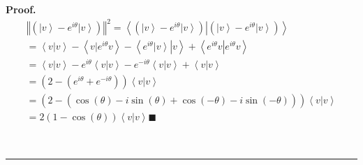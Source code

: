 \documentclass[aps,preprint]{revtex4}%
\newenvironment{proof}[1][Proof]{\noindent\textbf{#1.} }{\ \rule{0.5em}{0.5em}}
\begin{document}
\begin{proof}%
\begin{gather}
\left\Vert \left(  \left\vert v\right\rangle -e^{i\theta}\left\vert
v\right\rangle \right)  \right\Vert ^{2}=\left\langle \left.  \left(
\left\vert v\right\rangle -e^{i\theta}\left\vert v\right\rangle \right)
\right\vert \left(  \left\vert v\right\rangle -e^{i\theta}\left\vert
v\right\rangle \right)  \right\rangle \\
=\left\langle \left.  v\right\vert v\right\rangle -\left\langle \left.
v\right\vert e^{i\theta}v\right\rangle -\left\langle \left.  e^{i\theta
}\left\vert v\right\rangle \right\vert v\right\rangle +\left\langle \left.
e^{i\theta}v\right\vert e^{i\theta}v\right\rangle \\
=\left\langle \left.  v\right\vert v\right\rangle -e^{i\theta}\left\langle
\left.  v\right\vert v\right\rangle -e^{-i\theta}\left\langle \left.
v\right\vert v\right\rangle +\left\langle \left.  v\right\vert v\right\rangle
\\
=\left(  2-\left(  e^{i\theta}+e^{-i\theta}\right)  \right)  \left\langle
\left.  v\right\vert v\right\rangle \\
=\left(  2-\left(  \overset{}{\cos\left(  \theta\right)  -i\sin\left(
\theta\right)  +\cos\left(  -\theta\right)  -i\sin\left(  -\theta\right)
}\right)  \right)  \left\langle \left.  v\right\vert v\right\rangle \\
=2\left(  1-\cos\left(  \theta\right)  \right)  \left\langle \left.
v\right\vert v\right\rangle \blacksquare
\end{gather}

\end{proof}
\end{document}
